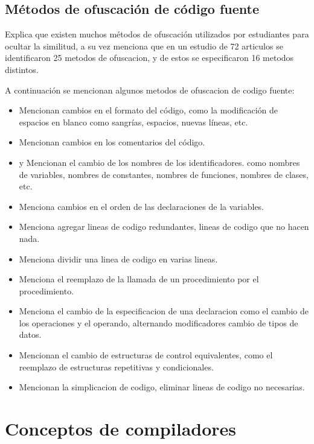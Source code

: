 \subsection{Métodos de ofuscación de código fuente}
\cite{10.1145/3313290} Explica que existen muchos métodos de ofuscación utilizados por estudiantes para ocultar la similitud, a su vez menciona que en un estudio de 72 articulos se identificaron 25 metodos de ofuscacion, y de estos se especificaron 16 metodos distintos.

\noindent A continuación se mencionan algunos metodos de ofuscacion de codigo fuente:
\begin{itemize}
    \item \cite{article3} Mencionan cambios en el formato del código, como la modificación de espacios en blanco como sangrías, espacios, nuevas líneas, etc.
    \item \cite{article3} Mencionan cambios en los comentarios del código.
    \item \cite{10.1093/comjnl/bxs018} y \cite{donaldson1981plagiarism} Mencionan el cambio de los nombres de los identificadores. como nombres de variables, nombres de constantes, nombres de funciones, nombres de clases, etc.
    \item \cite{donaldson1981plagiarism} Menciona cambios en el orden de las declaraciones de la variables.
    \item \cite{10.1145/800037.800954} Menciona agregar lineas de codigo redundantes, lineas de codigo que no hacen nada.
    \item \cite{donaldson1981plagiarism} Menciona dividir una linea de codigo en varias lineas.
    \item \cite{WHALE1990131} Menciona el reemplazo de la llamada de un procedimiento por el procedimiento.
    \item \cite{WHALE1990131} Menciona el cambio de la especificacion de una declaracion como el cambio de los operaciones y el operando, alternando modificadores cambio de tipos de datos.
    \item \cite{article3} Mencionan el cambio de estructuras de control equivalentes, como el reemplazo de estructuras repetitivas y condicionales.
    \item \cite{10.1093/comjnl/bxs018} Mencionan la simplicacion de codigo, eliminar lineas de codigo no necesarias.
\end{itemize}

\section{Conceptos de compiladores}


